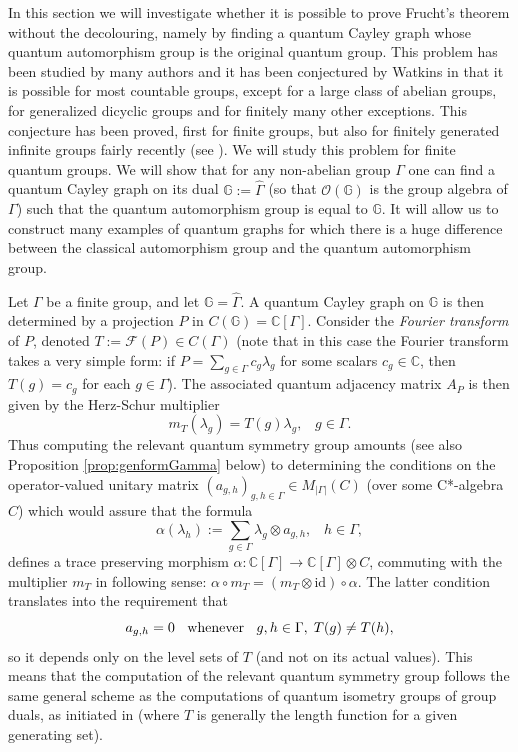 \documentclass[12pt]{amsart}
\theoremstyle{definition}
\theoremstyle{definition}
\theoremstyle{definition}
\theoremstyle{definition}
\newcommand{\id}{\mathrm{id}}
\newcommand{\G}{\mathbb{G}}
\newcommand{\C}{\mathbb{C}}
\newcommand{\cO}{\mathcal{O}}
\numberwithin{equation}{section}
\begin{document}
In this section we will investigate whether it is possible to prove Frucht's theorem without the decolouring, namely by finding a quantum Cayley graph whose quantum automorphism group is the original quantum group. This problem has been studied by many authors and it has been conjectured by Watkins in \cite{Wat76} that it is possible for most countable groups, except for a large class of abelian groups, for generalized dicyclic groups and for finitely many other exceptions. This conjecture has been proved, first for finite groups, but also for finitely generated infinite groups fairly recently (see \cite{LdlS}). We will study this problem for finite quantum groups. We will show that for any non-abelian group $\Gamma$ one can find a quantum Cayley graph on its dual $\G:=\widehat{\Gamma}$ (so that $\cO(\G)$ is the group algebra of $\Gamma$) such that the quantum automorphism group is equal to $\G$. It will allow us to construct many examples of quantum graphs for which there is a huge difference between the classical automorphism group and the quantum automorphism group.

Let $\Gamma$ be a finite group, and let $\G=\widehat{\Gamma}$. A quantum Cayley graph on $\G$ is then determined by a projection $P$ in $C(\G) = \C[\Gamma]$. Consider the \emph{Fourier transform} of $P$, denoted $T:=\mathcal F(P)\in C(\Gamma)$ (note that in this case the Fourier transform takes a very simple form: if $P=\sum_{g\in \Gamma} c_g\lambda_g$ for some scalars $c_g\in \C$, then $T(g) = c_g$ for each $g \in \Gamma$). The associated quantum adjacency matrix $A_P$ is then given by the Herz-Schur multiplier
\[ m_T(\lambda_g) = T(g) \lambda_g, \;\;\; g \in \Gamma.\]
Thus computing the relevant quantum symmetry group amounts (see also Proposition \ref{prop:genformGamma} below) to determining the conditions on the operator-valued unitary matrix $(a_{g,h})_{g, h \in \Gamma} \in M_{|\Gamma|}(C)$ (over some C*-algebra $C$) which would assure that the formula
\[ \alpha(\lambda_h):= \sum_{g \in \Gamma} \lambda_g \otimes a_{g,h}, \;\;\; h\in \Gamma, \]
defines a trace preserving morphism $\alpha:\C[\Gamma] \to \C[\Gamma] \otimes C$, commuting with the multiplier $m_T$ in following sense: $\alpha \circ m_{T} = (m_{T}\otimes \id)\circ \alpha$. The latter condition translates into the requirement that
\[ a_{g,h} = 0 \;\;\textup{ whenever } \;\;g, h \in \Gamma, \; T(g) \neq T(h),\]
so it depends only on the level sets of $T$ (and not on its actual values). 
This means that the computation of the relevant quantum symmetry group follows the same general scheme as the computations of quantum isometry groups of group duals, as initiated in \cite{BhS10} (where $T$ is generally the length function for a given generating set).
\end{document}
